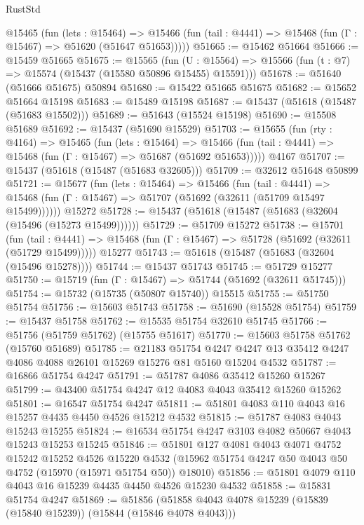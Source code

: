 \begin{lexlean}{RustStd}
\begin{coremodule}
    @15465
      (fun (lets : @15464) =>
      @15466 (fun (tail : @4441) => @15468 (fun (Γ : @15467) => @51620 (@51647 @51653)))))
@51665 := @15462 @51664
@51666 := @15459 @51665
@51675 := @15565
    (fun (U : @15564) => @15566 (fun (t : @7) => @15574 (@15437 (@15580 @50896 @15455) @15591)))
@51678 := @51640 (@51666 @51675) @50894
@51680 := @15422 @51665 @51675
@51682 := @15652 @51664 @15198
@51683 := @15489 @15198
@51687 := @15437 (@51618 (@15487 (@51683 @15502)))
@51689 := @51643 (@15524 @15198)
@51690 := @15508 @51689
@51692 := @15437 (@51690 @15529)
@51703 := @15655
    (fun (rty : @4164) =>
    @15465
      (fun (lets : @15464) =>
      @15466 (fun (tail : @4441) => @15468 (fun (Γ : @15467) => @51687 (@51692 @51653)))))
    @4167
@51707 := @15437 (@51618 (@15487 (@51683 @32605)))
@51709 := @32612 @51648 @50899
@51721 := @15677
    (fun (lets : @15464) =>
    @15466
      (fun (tail : @4441) =>
      @15468 (fun (Γ : @15467) => @51707 (@51692 (@32611 (@51709 @15497 @15499))))))
    @15272
@51728 := @15437 (@51618 (@15487 (@51683 (@32604 (@15496 (@15273 @15499))))))
@51729 := @51709 @15272
@51738 := @15701
    (fun (tail : @4441) => @15468 (fun (Γ : @15467) => @51728 (@51692 (@32611 (@51729 @15499)))))
    @15277
@51743 := @51618 (@15487 (@51683 (@32604 (@15496 @15278))))
@51744 := @15437 @51743
@51745 := @51729 @15277
@51750 := @15719 (fun (Γ : @15467) => @51744 (@51692 (@32611 @51745)))
@51754 := @15732 (@15735 (@50807 @15740)) @15515
@51755 := @51750 @51754
@51756 := @15603 @51743
@51758 := @51690 (@15528 @51754)
@51759 := @15437 @51758
@51762 := @15535 @51754 @32610 @51745
@51766 := @51756 (@51759 @51762) (@15755 @51617)
@51770 := @15603 @51758 @51762 (@15760 @51689)
@51785 := @21183
    @51754
    @4247
    @4247
    @13
    @35412
    @4247
    @4086
    @4088
    @26101
    @15269
    @15276
    @81
    @5160
    @15204
    @4532
@51787 := @16866 @51754 @4247
@51791 := @51787 @4086 @35412 @15260 @15267
@51799 := @43400 @51754 @4247 @12 @4083 @4043 @35412 @15260 @15262
@51801 := @16547 @51754 @4247
@51811 := @51801 @4083 @110 @4043 @16 @15257 @4435 @4450 @4526 @15212 @4532
@51815 := @51787 @4083 @4043 @15243 @15255
@51824 := @16534 @51754 @4247 @3103 @4082 @50667 @4043 @15243 @15253 @15245
@51846 := @51801
    @127
    @4081
    @4043
    @4071
    @4752
    @15242
    @15252
    @4526
    @15220
    @4532
    (@15962 @51754 @4247 @50 @4043 @50 @4752 (@15970 (@15971 @51754 @50)) @18010)
@51856 := @51801 @4079 @110 @4043 @16 @15239 @4435 @4450 @4526 @15230 @4532
@51858 := @15831 @51754 @4247
@51869 := @51856 (@51858 @4043 @4078 @15239 (@15839 (@15840 @15239)) (@15844 (@15846 @4078 @4043)))

\end{coremodule}
\end{lexlean}
